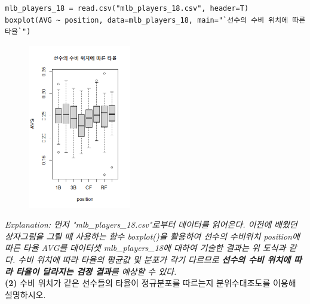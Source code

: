 \documentclass{article}
\begin{document}
\begin{lstlisting}[style={r-style}]
mlb_players_18 = read.csv("mlb_players_18.csv", header=T)
boxplot(AVG ~ position, data=mlb_players_18, main="`선수의 수비 위치에 따른 타율`")
\end{lstlisting}
\begin{figure}[htb!]
    \centering
    \includegraphics[width=0.4\textwidth]{fig/ex5-1.png}
\end{figure}
\emph{Explanation: 먼저 "mlb\_players\_18.csv"로부터 데이터를 읽어온다. 이전에 배웠던 상자그림을 그릴 때 사용하는 함수 boxplot()을 활용하여 선수의 수비위치 position에 따른 타율 AVG를 데이터셋 mlb\_players\_18에 대하여 기술한 결과는 위 도식과 같다. 수비 위치에 따라 타율의 평균값 및 분포가 각기 다르므로 \textbf{선수의 수비 위치에 따라 타율이 달라지는 검정 결과}를 예상할 수 있다.} \\

\textbf{(2)} 수비 위치가 같은 선수들의 타율이 정규분포를 따르는지 분위수대조도를 이용해 설명하시오.
\end{document}
